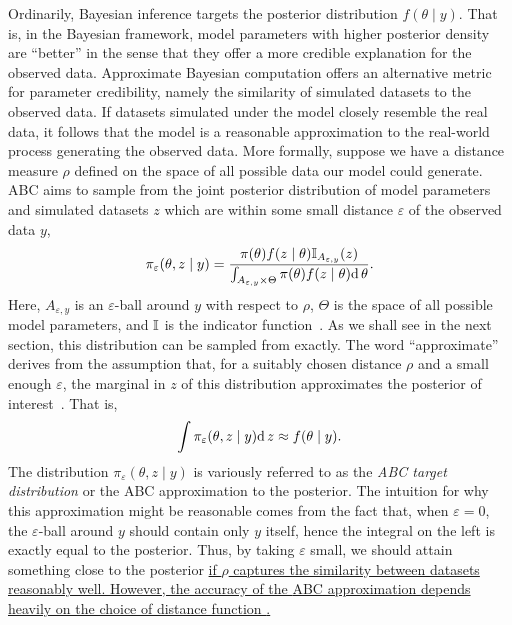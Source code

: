 {Ordinarily, Bayesian inference targets the posterior distribution $f(\theta
\mid y)$. That is, in the Bayesian framework, model parameters with higher
posterior density are ``better'' in the sense that they offer a more credible
explanation for the observed data. Approximate Bayesian computation offers an
alternative metric for parameter credibility, namely the similarity of
simulated datasets to the observed data. If datasets simulated under the model
closely resemble the real data, it follows that the model is a reasonable
approximation to the real-world process generating the observed data. More
formally, suppose we have a distance measure $\rho$ defined on the space of all
possible data our model could generate. \gls{ABC} aims to sample from the joint
posterior distribution of model parameters and simulated datasets $z$ which are
within some small distance $\varepsilon$ of the observed data $y$,
\[
  \pi_{\varepsilon}(\theta, z \mid y) =
  \frac{\pi(\theta) f(z \mid \theta) \mathbb{I}_{A_{\varepsilon, y}} (z)}
  {\int_{A_{\varepsilon, y} \times \Theta} \pi(\theta) f(z \mid \theta) \mathrm{d}\, \theta}.
\]
Here, $A_{\varepsilon, y}$ is an $\varepsilon$-ball around $y$ with
respect to $\rho$, $\Theta$ is the space of all possible model parameters, and
$\mathbb{I}$ is the indicator function~\autocite{marin2012approximate}. As we shall
see in the next section, this distribution can be sampled from exactly. The
word ``approximate'' derives from the assumption that, for a suitably chosen
distance $\rho$ and a small enough $\varepsilon$, the marginal in $z$ of
this distribution approximates the posterior of
interest~\autocite{marin2012approximate}. That is,
\[
  \int \pi_\varepsilon(\theta, z \mid y) \mathrm{d}\, z \approx f(\theta \mid y).
\]
The distribution $\pi_\varepsilon(\theta, z \mid y)$ is variously referred to
as the \textit{\gls{ABC} target distribution} or the \gls{ABC} approximation
to the posterior. The intuition for why this approximation might be reasonable
comes from the fact that, when $\varepsilon = 0$, the $\varepsilon$-ball around
$y$ should contain only $y$ itself, hence the integral on the left is exactly
equal to the posterior. Thus, by taking $\varepsilon$ small, we should attain
something close to the posterior {\color{blue}\uline{if $\rho$ captures the
similarity between datasets reasonably well. However, the accuracy of the
\gls{ABC} approximation depends heavily on the choice of distance function
\autocite{aeschbacher2012novel,blum2013comparative}.}}

}
